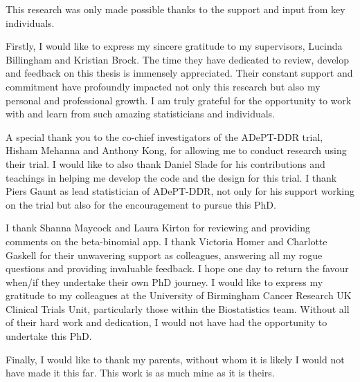 \documentclass[
12pt, %
english, %
doublespacing, %
nolistspacing,
headsepline, %
]{MastersDoctoralThesis} %
\begin{document}
\begin{acknowledgements}
\addchaptertocentry{\acknowledgementname} %
This research was only made possible thanks to the support and input from key individuals. 

Firstly, I would like to express my sincere gratitude to my supervisors, Lucinda Billingham and Kristian Brock. The time they have dedicated to review, develop and feedback on this thesis is immensely appreciated. Their constant support and commitment have profoundly impacted not only this research but also my personal and professional growth. I am truly grateful for the opportunity to work with and learn from such amazing statisticians and individuals. 

A special thank you to the co-chief investigators of the ADePT-DDR trial, Hisham Mehanna and Anthony Kong, for allowing me to conduct research using their trial. I would like to also thank Daniel Slade for his contributions and teachings in helping me develop the code and the design for this trial. I thank Piers Gaunt as lead statistician of ADePT-DDR, not only for his support working on the trial but also for the encouragement to pursue this PhD. 

I thank Shanna Maycock and Laura Kirton for reviewing and providing comments on the beta-binomial app. I thank Victoria Homer and Charlotte Gaskell for their unwavering support as colleagues, answering all my rogue questions and providing invaluable feedback. I hope one day to return the favour when/if they undertake their own PhD journey. 
I would like to express my gratitude to my colleagues at the University of Birmingham Cancer Research UK Clinical Trials Unit, particularly those within the Biostatistics team. Without all of their hard work and dedication, I would not have had the opportunity to undertake this PhD. 

Finally, I would like to thank my parents, without whom it is likely I would not have made it this far. This work is as much mine as it is theirs.  

\end{acknowledgements}


\tableofcontents %
\end{document}
